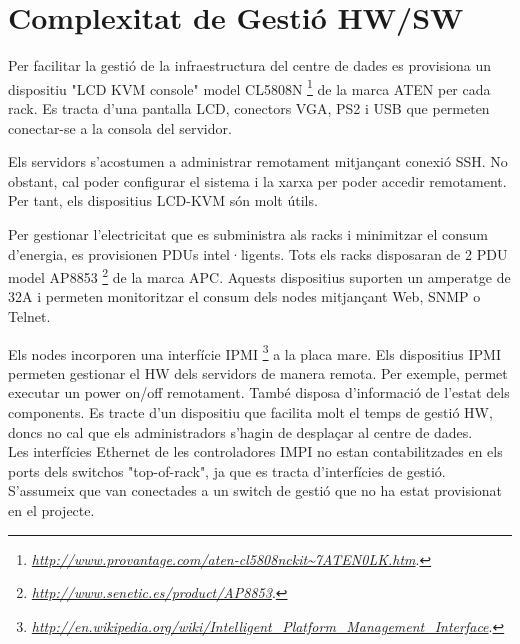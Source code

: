 \section{Complexitat de Gestió HW/SW}

Per facilitar la gestió de la infraestructura del centre de dades es provisiona un dispositiu "LCD KVM console" model CL5808N \footnote{\textit{\url{http://www.provantage.com/aten-cl5808nckit~7ATEN0LK.htm}}.} de la marca ATEN per cada rack. Es tracta d'una pantalla LCD, conectors VGA, PS2 i USB que permeten conectar-se a la consola del servidor. 

Els servidors s'acostumen a administrar remotament mitjançant conexió SSH. No obstant, cal poder configurar el sistema i la xarxa per poder accedir remotament. Per tant, els dispositius LCD-KVM són molt útils. 

Per gestionar l'electricitat que es subministra als racks i minimitzar el consum d'energia, es provisionen PDUs intel·ligents. Tots els racks disposaran de 2 PDU model AP8853 \footnote{\textit{\url{http://www.senetic.es/product/AP8853}}.} de la marca APC. Aquests dispositius suporten un amperatge de 32A i permeten monitoritzar el consum dels nodes mitjançant Web, SNMP o Telnet.

Els nodes incorporen una interfície IPMI \footnote{\textit{\url{http://en.wikipedia.org/wiki/Intelligent\_Platform\_Management\_Interface}}.} a la placa mare. Els dispositius IPMI permeten gestionar el HW dels servidors de manera remota. Per exemple, permet executar un power on/off remotament. També disposa d'informació de l'estat dels components. Es tracte d'un dispositiu que facilita molt el temps de gestió HW, doncs no cal que els administradors s'hagin de desplaçar al centre de dades. \\
Les interfícies Ethernet de les controladores IMPI no estan contabilitzades en els ports dels switchos "top-of-rack", ja que es tracta d'interfícies de gestió. S'assumeix que van conectades a un switch de gestió que no ha estat provisionat en el projecte. 

